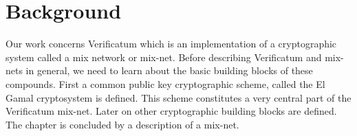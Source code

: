 \section{Background}

Our work concerns Verificatum which is an implementation of a
cryptographic system called a mix network or mix-net. Before
describing Verificatum and mix-nets in general, we need to learn about
the basic building blocks of these compounds. First a common public
key cryptographic scheme, called the El Gamal cryptosystem is
defined. This scheme constitutes a very central part of the
Verificatum mix-net. Later on other cryptographic building blocks are
defined. The chapter is concluded by a description of a mix-net.




